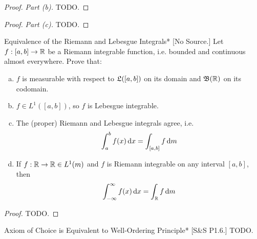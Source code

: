 \begin{proof}
    \emph{Part (b).} TODO. 
\end{proof}


\begin{proof}
    \emph{Part (c).} TODO. 
\end{proof}


\begin{problem}{Equivalence of the Riemann and Lebesgue Integrals}*
    [No Source.] Let \(f : [a, b] \to \mathbb{R}\) be a Riemann integrable function, i.e. bounded and continuous almost everywhere. Prove that: 
    \begin{enumerate}[(a)]
        \itemsep0em
        \item \(f\) is measurable with respect to \(\mathfrak{L}([a, b])\) on its domain and \(\mathfrak{B}(\mathbb{R})\) on its codomain. 
        \item \(f \in L^1([a, b])\), so \(f\) is Lebesgue integrable. 
        \item The (proper) Riemann and Lebesgue integrals agree, i.e. 
        \[
            \int_a^b f(x) \, \mathrm{d}x = \int_{[a, b]} f \, \mathrm{d}m
        \]
        \item If \(f : \mathbb{R} \to \mathbb{R} \in L^1(m)\) and $f$ is Riemann integrable on any interval $[a, b]$, then 
        \[
            \int_{-\infty}^{\infty} f(x) \, \mathrm{d}x = \int_{\mathbb{R}} f \, \mathrm{d}m
        \]
    \end{enumerate}
\end{problem}

\begin{proof}
    TODO. 
\end{proof}


\begin{problem}{Axiom of Choice is Equivalent to Well-Ordering Principle}*
    [S\&S P1.6.] TODO. 
\end{problem}


